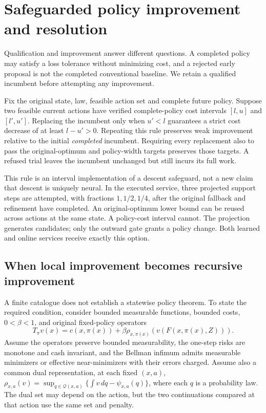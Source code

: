 \section{Safeguarded policy improvement and resolution}\label{sec:improvement109}
Qualification and improvement answer different questions. A completed policy may satisfy a loss tolerance without minimizing cost, and a rejected early proposal is not the completed conventional baseline. We retain a qualified incumbent before attempting any improvement.

\begin{proposition}\label{prop:safe109}
Fix the original state, law, feasible action set and complete future policy. Suppose two feasible current actions have verified complete-policy cost intervals $[l,u]$ and $[l',u']$. Replacing the incumbent only when $u'<l$ guarantees a strict cost decrease of at least $l-u'>0$. Repeating this rule preserves weak improvement relative to the initial \emph{completed} incumbent. Requiring every replacement also to pass the original-optimum and policy-width targets preserves those targets. A refused trial leaves the incumbent unchanged but still incurs its full work.
\end{proposition}

This rule is an interval implementation of a descent safeguard, not a new claim that descent is uniquely neural. In the executed service, three projected support steps are attempted, with fractions $1,1/2,1/4$, after the original fallback and refinement have completed. An original-optimum lower bound can be reused across actions at the same state. A policy-cost interval cannot. The projection generates candidates; only the outward gate grants a policy change. Both learned and online services receive exactly this option.

\subsection{When local improvement becomes recursive improvement}
A finite catalogue does not establish a statewise policy theorem. To state the required condition, consider bounded measurable functions, bounded costs, $0<\beta<1$, and original fixed-policy operators
\[
 T_\pi v(x)=c(x,\pi(x))+\beta\rho_{x,\pi(x)}(v(F(x,\pi(x),Z))).
\]
Assume the operators preserve bounded measurability, the one-step risks are monotone and cash invariant, and the Bellman infimum admits measurable minimizers or effective near-minimizers with their errors charged. Assume also a common dual representation, at each fixed $(x,a)$,
$\rho_{x,a}(v)=\sup_{q\in\mathcal Q(x,a)}\{\int v\,dq-\psi_{x,a}(q)\}$,
where each $q$ is a probability law. The dual set may depend on the action, but the two continuations compared at that action use the same set and penalty.

